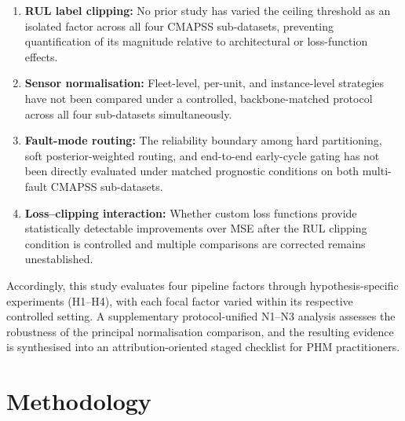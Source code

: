 \documentclass[review,12pt]{elsarticle}
\begin{document}
\begin{enumerate}
\item \textbf{RUL label clipping:} No prior study has varied the ceiling threshold as an isolated factor across all four CMAPSS sub-datasets, preventing quantification of its magnitude relative to architectural or loss-function effects.
\item \textbf{Sensor normalisation:} Fleet-level, per-unit, and instance-level strategies have not been compared under a controlled, backbone-matched protocol across all four sub-datasets simultaneously.
\item \textbf{Fault-mode routing:} The reliability boundary among hard partitioning, soft posterior-weighted routing, and end-to-end early-cycle gating has not been directly evaluated under matched prognostic conditions on both multi-fault CMAPSS sub-datasets.
\item \textbf{Loss--clipping interaction:} Whether custom loss functions provide statistically detectable improvements over MSE after the RUL clipping condition is controlled and multiple comparisons are corrected remains unestablished.
\end{enumerate}

Accordingly, this study evaluates four pipeline factors through hypothesis-specific experiments (H1--H4), with each focal factor varied within its respective controlled setting. A supplementary protocol-unified N1--N3 analysis assesses the robustness of the principal normalisation comparison, and the resulting evidence is synthesised into an attribution-oriented staged checklist for PHM practitioners.

\section{Methodology}
\end{document}
